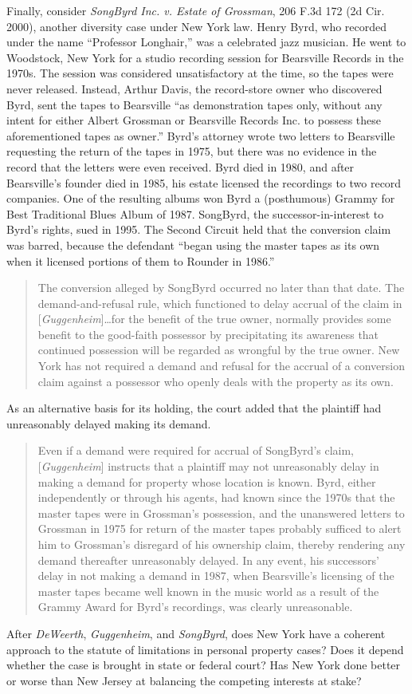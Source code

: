 Finally, consider \textit{SongByrd Inc. v. Estate of Grossman}, 206 F.3d 172 (2d
Cir. 2000), another diversity case under New York law. Henry Byrd, who recorded
under the name ``Professor Longhair,'' was a celebrated jazz musician. He went
to Woodstock, New York for a studio recording session for Bearsville Records in
the 1970s. The session was considered unsatisfactory at the time, so the tapes
were never released. Instead, Arthur Davis, the record-store owner who
discovered Byrd, sent the tapes to Bearsville ``as demonstration tapes only,
without any intent for either Albert Grossman or Bearsville Records Inc. to
possess these aforementioned tapes as owner.'' Byrd's attorney wrote two
letters to Bearsville requesting the return of the tapes in 1975, but there was
no evidence in the record that the letters were even received. Byrd died in
1980, and after Bearsville's founder died in 1985, his estate licensed the
recordings to two record companies. One of the resulting albums won Byrd a
(posthumous) Grammy for Best Traditional Blues Album of 1987. SongByrd, the
successor-in-interest to Byrd's rights, sued in 1995. The Second Circuit held
that the conversion claim was barred, because the defendant ``began using the
master tapes as its own when it licensed portions of them to Rounder in 1986.''
\begin{quote}
The conversion alleged by SongByrd occurred no later than that date. The
demand-and-refusal rule, which functioned to delay accrual of the claim in
[\textit{Guggenheim}]\dots for the benefit of the true owner, normally
provides some benefit to the good-faith possessor by precipitating its
awareness that continued possession will be regarded as wrongful by the true
owner. New York has not required a demand and refusal for the accrual of a
conversion claim against a possessor who openly deals with the property as its
own. 
\end{quote}
As an alternative basis for its holding, the court added that the plaintiff had
unreasonably delayed making its demand.
\begin{quote}
Even if a demand were required for accrual of SongByrd's claim,
[\textit{Guggenheim}] instructs that a plaintiff may not unreasonably delay in
making a demand for property whose location is known. Byrd, either
independently or through his agents, had known since the 1970s that the master
tapes were in Grossman's possession, and the unanswered letters to Grossman in
1975 for return of the master tapes probably sufficed to alert him to
Grossman's disregard of his ownership claim, thereby rendering any demand
thereafter unreasonably delayed. In any event, his successors' delay in not
making a demand in 1987, when Bearsville's licensing of the master tapes became
well known in the music world as a result of the Grammy Award for Byrd's
recordings, was clearly unreasonable.
\end{quote}

After \textit{DeWeerth}, \textit{Guggenheim}, and \textit{SongByrd}, does New
York have a coherent approach to the statute of limitations in personal
property cases? Does it depend whether the case is brought in state or federal
court? Has New York done better or worse than New Jersey at balancing the
competing interests at stake?


